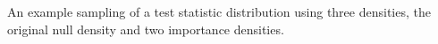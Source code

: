 An example sampling of a test statistic distribution using three densities, the original null density and two importance densities.